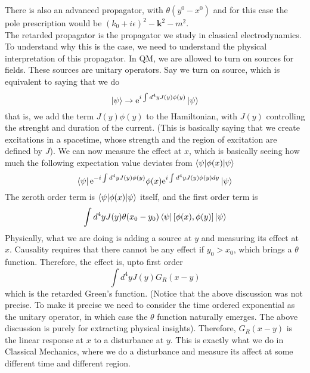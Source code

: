 \documentclass[11pt]{article}
\newcommand{\e}{\mathrm{e}}
\numberwithin{equation}{section}
\begin{document}
    There is also an advanced propagator, with \(\theta(y^0-x^0)\) and for this case the pole prescription would be \((k_0 + i\epsilon)^2 - \textbf{k}^2 - m^2\).\\

    The retarded propagator is the propagator we study in classical electrodynamics. To understand why this is the case, we need to understand the physical interpretation of this propagator. In QM, we are allowed to turn on sources for fields. These sources are unitary operators. Say we turn on source, which is equivalent to saying that we do 
    \begin{equation*}
        \ket{\psi} \to \e^{i\int d^4y J(y) \phi(y)} \ket{\psi}
    \end{equation*}
    that is, we add the term \(J(y) \phi(y)\) to the Hamiltonian, with \(J(y)\) controlling the strenght and duration of the current. (This is basically saying that we create excitations in a spacetime, whose strength and the region of excitation are defined by \(J\)). We can now measure the effect at \(x\), which is basically seeing how much the following expectation value deviates from  \(\braket{\psi | \phi(x) | \psi}\)
    \begin{equation*}
        \bra{\psi} \e^{-i\int d^4y J(y) \phi(y) } \phi(x) \e^{i\int d^4y J(y) \phi(y) dy} \ket{\psi}
    \end{equation*}
    The zeroth order term is \(\braket{\psi | \phi(x) | \psi}\) itself, and the first order term is 
    \begin{equation*}
        \int d^4y J(y) \theta(x_0 - y_0)\bra{\psi}[\phi(x), \phi(y)]\ket{\psi}
    \end{equation*}
    Physically, what we are doing is adding a source at \(y\) and measuring its effect at \(x\). Causality requires that there cannot be any effect if \(y_0 > x_0\), which brings a \(\theta\) function. Therefore, the effect is, upto first order 
    \begin{equation*}
        \int d^4y J(y) G_R(x-y) 
    \end{equation*}
    which is the retarded Green's function. (Notice that the above discussion was not precise. To make it precise we need to consider the time ordered exponential as the unitary operator, in which case the \(\theta\) function naturally emerges. The above discussion is purely for extracting physical insights). Therefore, \(G_R(x-y)\) is the linear response at \(x\) to a disturbance at \(y\). This is exactly what we do in Classical Mechanics, where we do a disturbance and measure its affect at some different time and different region.
\end{document}
